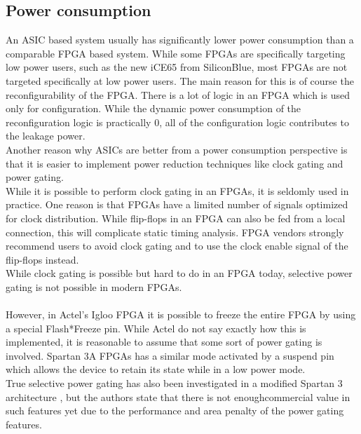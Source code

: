 \subsection{Power consumption}
An ASIC based system usually has significantly lower power consumption
than a comparable FPGA based system. While some FPGAs are
specifically targeting low power users, such as the new iCE65 from SiliconBlue,
most FPGAs are not targeted specifically at low power users.
The main reason for this is of course the reconfigurability of the FPGA.
There is a lot of logic in an FPGA which is used only for configuration.
While the dynamic power consumption of the reconfiguration logic
is practically 0, all of the configuration logic contributes to the leakage
power.\\
Another reason why ASICs are better from a power consumption perspective
is that it is easier to implement power reduction techniques like
clock gating and power gating.\\
While it is possible to perform clock gating in an FPGAs, it is seldomly
used in practice. One reason is that FPGAs have a limited number
of signals optimized for clock distribution. While flip-flops in an FPGA
can also be fed from a local connection, this will complicate static timing
analysis. FPGA vendors strongly recommend users to avoid clock gating
and to use the clock enable signal of the flip-flops instead.\\
While clock gating is possible but hard to do in an FPGA today, selective
power gating is not possible in modern FPGAs. \\
\\However, in Actel\textquoteright s Igloo \cite{asic3} FPGA it is possible to freeze the entire FPGA by using a special Flash*Freeze pin. While Actel do not say exactly how this is implemented,
it is reasonable to assume that some sort of power gating is involved.
Spartan 3A FPGAs has a similar mode activated by a suspend pin which
allows the device to retain its state while in a low power mode.\\
True selective power gating has also been investigated in a modified
Spartan 3 architecture \cite{asic4}, but the authors state that there is not enoughcommercial value in such features yet due to the performance and area
penalty of the power gating features.

